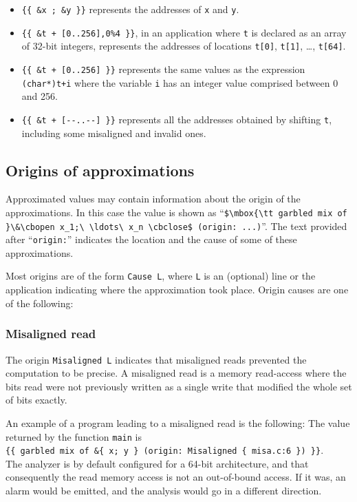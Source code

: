 \documentclass{frama-c-book}
\newcommand{\cbopen}{\mbox{\tt \{}}
\newcommand{\cbclose}{\mbox{\tt \}}}
\begin{document}
\begin{itemize}
\item \lstinline|{{ &x ; &y }}|
      represents the addresses of \lstinline|x| and \lstinline|y|.

\item \lstinline|{{ &t + [0..256],0%4 }}|, in an application where
  \lstinline|t| is declared as an array of 32-bit integers, represents
  the addresses of locations \lstinline|t[0]|, \lstinline|t[1]|, \ldots, \lstinline|t[64]|.

\item \lstinline|{{ &t + [0..256] }}|
represents the same values as the expression \lstinline|(char*)t+i|
where the variable \lstinline|i| has an integer value comprised between 0 and 256.

\item \lstinline|{{ &t + [--..--] }}|
      represents all the addresses obtained by shifting \lstinline|t|, including
some misaligned and invalid ones.

\end{itemize}

\subsection{Origins of approximations}

Approximated values may  contain
information about the origin of the approximations.  In this
case the value is shown as ``\lstinline|$\mbox{\tt garbled mix of }\&\cbopen x_1;\ \ldots\ x_n \cbclose$ (origin: ...)|''.
The text provided after ``\lstinline|origin:|'' indicates the
location and the cause of
some of these approximations.
\goodbreak

Most origins are of the form \lstinline|Cause L|, where \lstinline|L|
is an (optional) line or the application indicating where the approximation
took place. Origin causes are one of the following:
\subsubsection{Misaligned read}
The origin \lstinline$Misaligned L$ indicates that
misaligned reads prevented the computation to be precise.
A misaligned read is a memory read-access where the bits read were not
previously written as a single write that modified the whole set of
bits exactly.

An example of a program leading to a misaligned read is the following:
The value returned by the function \lstinline|main| is\\
\lstinline|{{ garbled mix of &{ x; y } (origin: Misaligned { misa.c:6 }) }}|.\\
The analyzer is by default configured for a 64-bit architecture,
and that consequently the read memory access is not an out-of-bound access.
If it was, an alarm would be emitted, and the
analysis would go in a different direction.
\end{document}
